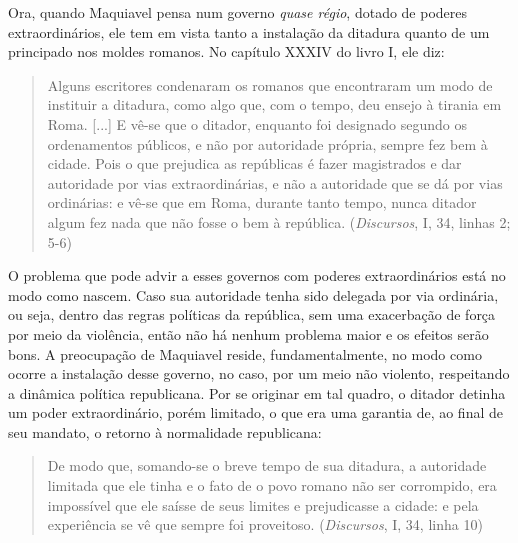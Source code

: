 Ora, quando Maquiavel pensa num governo \emph{quase régio}, dotado de
poderes extraordinários, ele tem em vista tanto a instalação da ditadura
quanto de um principado nos moldes romanos. No capítulo XXXIV do livro
I, ele diz:

\begin{quote}
Alguns escritores condenaram os romanos que encontraram um modo de
instituir a ditadura, como algo que, com o tempo, deu ensejo à tirania
em Roma. {[}...{]} E vê-se que o ditador, enquanto foi designado segundo
os ordenamentos públicos, e não por autoridade própria, sempre fez bem à
cidade. Pois o que prejudica as repúblicas é fazer magistrados e dar
autoridade por vias extraordinárias, e não a autoridade que se dá por
vias ordinárias: e vê-se que em Roma, durante tanto tempo, nunca ditador
algum fez nada que não fosse o bem à república. (\emph{Discursos}, I,
34, linhas 2; 5-6)
\end{quote}

O problema que pode advir a esses governos com poderes extraordinários
está no modo como nascem. Caso sua autoridade tenha sido delegada por
via ordinária, ou seja, dentro das regras políticas da república, sem
uma exacerbação de força por meio da violência, então não há nenhum
problema maior e os efeitos serão bons. A preocupação de Maquiavel
reside, fundamentalmente, no modo como ocorre a instalação desse
governo, no caso, por um meio não violento, respeitando a dinâmica
política republicana. Por se originar em tal quadro, o ditador detinha
um poder extraordinário, porém limitado, o que era uma garantia de, ao
final de seu mandato, o retorno à normalidade republicana:

\begin{quote}
De modo que, somando-se o breve tempo de sua ditadura, a autoridade
limitada que ele tinha e o fato de o povo romano não ser corrompido, era
impossível que ele saísse de seus limites e prejudicasse a cidade: e
pela experiência se vê que sempre foi proveitoso. (\emph{Discursos}, I,
34, linha 10)
\end{quote}

